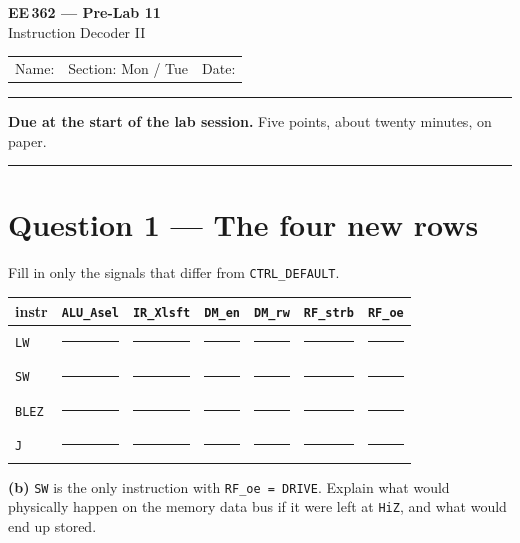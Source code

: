 \documentclass[11pt]{article}
\newcommand{\code}[1]{\texttt{#1}}
\begin{document}
\begin{center}
{\Large\bfseries EE\,362 --- Pre-Lab 11}\\[2pt]
{\large Instruction Decoder II}\\[6pt]
\begin{tabular}{@{}p{6.5cm}p{4cm}p{4cm}@{}}
Name: \hrulefill & Section: Mon / Tue & Date: \hrulefill
\end{tabular}
\end{center}

\vspace{2pt}\hrule\vspace{4pt}

{\small\textbf{Due at the start of the lab session.} Five points, about twenty
minutes, on paper.}

\vspace{4pt}\hrule

\section*{Question 1 --- The four new rows}

Fill in only the signals that differ from \code{CTRL\_DEFAULT}.

\begin{center}
\small
\begin{tabular}{lllllll}
\toprule
instr & \code{ALU\_Asel} & \code{IR\_Xlsft} & \code{DM\_en} & \code{DM\_rw} & \code{RF\_strb} & \code{RF\_oe} \\
\midrule
\code{LW}   & \rule{1.6cm}{0.4pt} & \rule{1.4cm}{0.4pt} & \rule{1.4cm}{0.4pt} & \rule{1.2cm}{0.4pt} & \rule{1.6cm}{0.4pt} & \rule{1.4cm}{0.4pt} \\[6pt]
\code{SW}   & \rule{1.6cm}{0.4pt} & \rule{1.4cm}{0.4pt} & \rule{1.4cm}{0.4pt} & \rule{1.2cm}{0.4pt} & \rule{1.6cm}{0.4pt} & \rule{1.4cm}{0.4pt} \\[6pt]
\code{BLEZ} & \rule{1.6cm}{0.4pt} & \rule{1.4cm}{0.4pt} & \rule{1.4cm}{0.4pt} & \rule{1.2cm}{0.4pt} & \rule{1.6cm}{0.4pt} & \rule{1.4cm}{0.4pt} \\[6pt]
\code{J}    & \rule{1.6cm}{0.4pt} & \rule{1.4cm}{0.4pt} & \rule{1.4cm}{0.4pt} & \rule{1.2cm}{0.4pt} & \rule{1.6cm}{0.4pt} & \rule{1.4cm}{0.4pt} \\
\bottomrule
\end{tabular}
\end{center}

\textbf{(b)} \code{SW} is the only instruction with \code{RF\_oe = DRIVE}.
Explain what would physically happen on the memory data bus if it were left at
\code{HiZ}, and what would end up stored.
\end{document}
